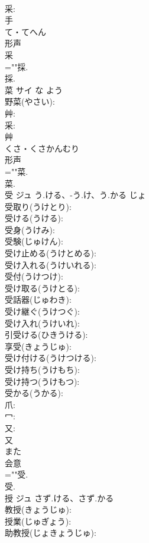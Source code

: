 \documentclass[8pt]{extreport}
\begin{document}
\begin{CJK}{UTF8}{min}
\\	采: 
\\	手	
\\	て・てへん	
\\	形声 
\\	采 
\\	=""採.
\\	採.
\\	菜	サイ	な	よう	
\\	野菜(やさい): 
\\	艸: 
\\	采: 
\\	艸	
\\	くさ・くさかんむり	
\\	形声 
\\	=""菜.
\\	菜.
\\	受	ジュ	う.ける、-う.け、う.かる	じょ	
\\	受取り(うけとり): 
\\	受ける(うける): 
\\	受身(うけみ): 
\\	受験(じゅけん): 
\\	受け止める(うけとめる): 
\\	受け入れる(うけいれる): 
\\	受付(うけつけ): 
\\	受け取る(うけとる): 
\\	受話器(じゅわき): 
\\	受け継ぐ(うけつぐ): 
\\	受け入れ(うけいれ): 
\\	引受ける(ひきうける): 
\\	享受(きょうじゅ): 
\\	受け付ける(うけつける): 
\\	受け持ち(うけもち): 
\\	受け持つ(うけもつ): 
\\	受かる(うかる): 
\\	爪: 
\\	冖: 
\\	又: 
\\	又	
\\	また	
\\	会意 
\\	=""受.
\\	受.
\\	授	ジュ	さず.ける、さず.かる		
\\	教授(きょうじゅ): 
\\	授業(じゅぎょう): 
\\	助教授(じょきょうじゅ): 

\end{CJK}
\end{document}
